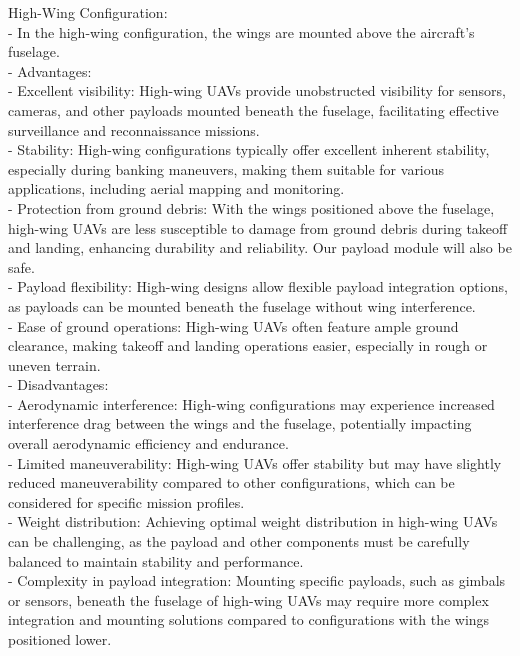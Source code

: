 \documentclass[12 pt]{article}
\begin{document}
\color{red}
High-Wing Configuration:
\color{black}
\\- In the high-wing configuration, the wings are mounted above the aircraft's fuselage.
\color{red}
\\- Advantages:
\color{black}
\\  - Excellent visibility: High-wing UAVs provide unobstructed visibility for sensors, cameras, and other payloads mounted beneath the fuselage, facilitating effective surveillance and reconnaissance missions.
\\  - Stability: High-wing configurations typically offer excellent inherent stability, especially during banking maneuvers, making them suitable for various applications, including aerial mapping and monitoring.
\\  - Protection from ground debris: With the wings positioned above the fuselage, high-wing UAVs are less susceptible to damage from ground debris during takeoff and landing, enhancing durability and reliability. Our payload module will also be safe.
\\  - Payload flexibility: High-wing designs allow flexible payload integration options, as payloads can be mounted beneath the fuselage without wing interference.
 \\ - Ease of ground operations: High-wing UAVs often feature ample ground clearance, making takeoff and landing operations easier, especially in rough or uneven terrain.
\color{red}
\\- Disadvantages:
\color{black}
\\  - Aerodynamic interference: High-wing configurations may experience increased interference drag between the wings and the fuselage, potentially impacting overall aerodynamic efficiency and endurance.
\\  - Limited maneuverability: High-wing UAVs offer stability but may have slightly reduced maneuverability compared to other configurations, which can be considered for specific mission profiles.
\\  - Weight distribution: Achieving optimal weight distribution in high-wing UAVs can be challenging, as the payload and other components must be carefully balanced to maintain stability and performance.
\\  - Complexity in payload integration: Mounting specific payloads, such as gimbals or sensors, beneath the fuselage of high-wing UAVs may require more complex integration and mounting solutions compared to configurations with the wings positioned lower.
\vspace{5mm} 
\end{document}
